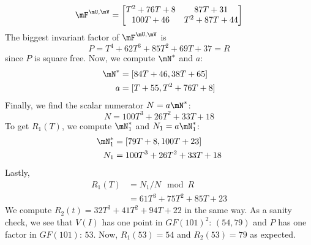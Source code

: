 \documentclass[12pt]{article}
\begin{document}
$$ \mF^{\mU,\mV} =
\begin{bmatrix}
T^2 + 76T + 8&       87T + 31\\
    100T + 46& T^2 + 87T + 44
\end{bmatrix}
$$
The biggest invariant factor of $\mF^{\mU,\mV}$ is 
$$P = T^4 + 62T^3 + 85T^2 + 69T + 37 = R$$
since $P$ is square free. 
Now, we compute $\mN^*$ and $a$:
\begin{align*}
\mN^* &=[84T + 46, 38T + 65]\\
a &= [T + 55, T^2 + 76T + 8]
\end{align*}
Finally, we find the scalar numerator $N = a\mN^*$:
$$ N = 100T^3 + 26T^2 + 33T + 18$$
To get $R_1(T)$, we compute $\mN_1^*$ and $N_1=a\mN_1^*$:
\begin{align*}
\mN_1^* &= [79T + 8, 100T + 23]\\
N_1 &= 100T^3 + 26T^2 + 33T + 18
\end{align*}
Lastly,
\begin{align*}
R_1(T) &= N_1 / N \mod R \\
       &= 61T^3 + 75T^2 + 85T + 23
\end{align*}
We compute $R_2(t)= 32T^3 + 41T^2 + 94T + 22$ in the same way. 
As a sanity check,
we see that $V(I)$ has one point in $GF(101)^2$:
$(54,79)$ and $P$ has one factor in $GF(101)$: $53$. Now,
$R_1(53) = 54$ and $R_2(53) = 79$ as expected.

\newpage
\end{document}
